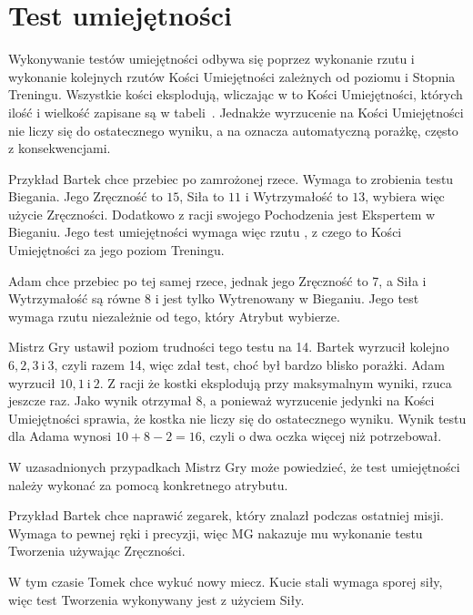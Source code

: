 \section{Test umiejętności}

Wykonywanie testów umiejętności odbywa się poprzez wykonanie rzutu   i
wykonanie kolejnych rzutów Kości Umiejętności zależnych  od  poziomu  i  Stopnia
Treningu.  Wszystkie  kości  eksplodują,  wliczając  w	to	Kości  Umiejętności,
których  ilość	i  wielkość  zapisane  są	w	tabeli~.
Jednakże wyrzucenie  	na	Kości  Umiejętności  nie  liczy  się  do
ostatecznego wyniku, a  na  oznacza automatyczną	porażkę,
często z konsekwencjami.


\begin{boxed}{Przykład}
	Bartek chce  przebiec  po  zamrożonej  rzece.	Wymaga	to	zrobienia  testu
	Biegania.  Jego Zręczność to $15$, Siła to	$11$  i  Wytrzymałość  to  $13$,
	wybiera więc użycie Zręczności.  Dodatkowo z racji swojego Pochodzenia	jest
	Ekspertem w Bieganiu.  Jego test umiejętności wymaga więc rzutu , z czego  to Kości  Umiejętności  za  jego  poziom  Treningu.

	Adam chce przebiec po tej samej rzece, jednak jego Zręczność to 7, a Siła  i
	Wytrzymałość są równe 8 i jest tylko  Wytrenowany  w  Bieganiu.   Jego	test
	wymaga rzutu  niezależnie od tego, który  Atrybut  wybierze.

	Mistrz Gry ustawił poziom trudności  tego  testu  na  14.	Bartek	wyrzucił
	kolejno $6, 2, 3\ \text{i}\ 3$, czyli razem 14, więc  zdał	test,  choć  był
    bardzo blisko porażki. Adam wyrzucił $10, 1\ \text{i}\ 2$. Z racji że kostki
    eksplodują przy maksymalnym wyniki, rzuca  jeszcze raz. Jako wynik
	otrzymał $8$, a ponieważ wyrzucenie jedynki na Kości  Umiejętności	sprawia,
    że kostka nie liczy się do ostatecznego wyniku. Wynik testu dla Adama wynosi
	$  10  +  8  -	2  =  16$,	czyli  o  dwa  oczka  więcej  niż	potrzebował.
\end{boxed}

W uzasadnionych przypadkach Mistrz Gry może  powiedzieć,  że  test	umiejętności
należy wykonać za  pomocą  konkretnego  atrybutu.

\begin{boxed}{Przykład}
	Bartek chce naprawić zegarek, który znalazł podczas ostatniej misji.  Wymaga
	to pewnej ręki i precyzji, więc MG nakazuje  mu  wykonanie	testu  Tworzenia
    używając Zręczności.

	W tym czasie Tomek chce wykuć nowy miecz.  Kucie stali wymaga  sporej  siły,
    więc test Tworzenia wykonywany jest z użyciem Siły.
\end{boxed}

